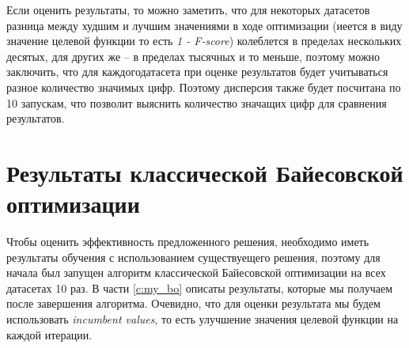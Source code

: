 \documentclass[times,specification,annotation]{itmo-student-thesis}
\begin{document}
	Если оценить результаты, то можно заметить, что для некоторых датасетов разница между худшим и лучшим значениями в ходе оптимизации (иеется в виду значение целевой функции то есть \textit{1 - F-score}) колеблется в пределах нескольких десятых, для других же -- в пределах тысячных и то меньше, поэтому можно заключить, что для каждогодатасета при оценке результатов будет учитываться разное количество значимых цифр. Поэтому дисперсия также будет посчитана по 10 запускам,  что позволит выяснить количество значащих цифр для сравнения результатов.
	\section{Результаты классической Байесовской оптимизации} \label{s:bo-res}
	Чтобы оценить эффективность предложенного решения, необходимо иметь результаты обучения с использованием существуещего решения, поэтому для начала был запущен алгоритм классической Байесовской оптимизации на всех датасетах 10 раз. В части \ref{c:my_bo} описаты результаты, которые мы получаем после завершения алгоритма. Очевидно, что для оценки результата мы будем использовать \textit{incumbent values}, то есть улучшение значения целевой функции на каждой итерации. \par 
	
\end{document}

